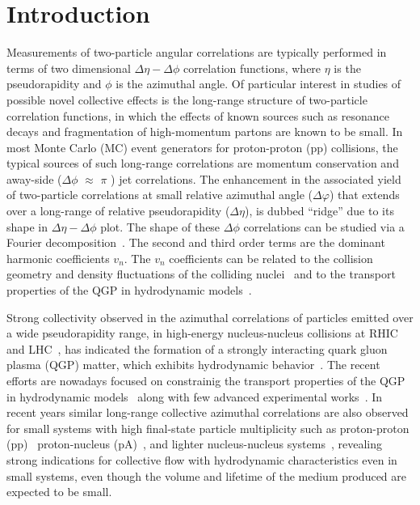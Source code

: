 
\section{Introduction}
\label{sec:intro}

Measurements of two-particle angular correlations are typically performed in terms of two dimensional $\Delta\eta-\Delta\phi$ correlation functions, where $\eta$ is the pseudorapidity and $\phi$ is the azimuthal angle. Of particular interest in studies of possible novel  collective effects is the long-range structure of two-particle correlation functions, in which the effects of known sources such as resonance decays and fragmentation of high-momentum partons are known to be small. In most Monte Carlo (MC) event generators for proton-proton (pp) collisions, the typical sources of such long-range correlations are momentum conservation and away-side ($\Delta\phi$ $\approx$ $\pi$ ) jet correlations.
The enhancement in the associated yield of two-particle correlations at small relative azimuthal angle ($\Delta\varphi$) that extends over a long-range of relative pseudorapidity ($\Delta\eta$), is dubbed ``ridge'' due to its shape in $\Delta\eta-\Delta\phi$ plot.
The shape of these $\Delta\phi$ correlations can be studied via a Fourier decomposition~\cite{Poskanzer:1998yz,Voloshin:2008dg}. The second and third order terms are the dominant harmonic coefficients $v_n$. The $v_n$ coefficients can be related to the collision geometry and density fluctuations of the colliding nuclei~\cite{Alver:2010gr,Alver:2010dn,ALICE:2011ab} and to the transport properties of the QGP in hydrodynamic models~\cite{Bernhard:2016tnd,Bernhard2019}.

Strong collectivity observed in the azimuthal correlations of particles emitted over a wide pseudorapidity range, in high-energy nucleus-nucleus collisions at RHIC~\cite{Adams:2005dq,Adcox:2004mh,Arsene:2004fa,Back:2004je} and LHC~\cite{Abelev:2012di, Abelev:2014pua, ATLAS:2011ah}, has indicated the formation of a strongly interacting quark gluon plasma (QGP) matter, which exhibits hydrodynamic behavior~\cite{Romatschke:2007mq}. The recent efforts are nowadays focused on constrainig the transport properties of the QGP in hydrodynamic models~\cite{Bernhard:2016tnd,Bernhard2019} along with few advanced experimental works~\cite{ALICE:2016kpq,Acharya:2017gsw,Acharya:2017zfg,Acharya:2020taj}.
In recent years similar long-range collective azimuthal correlations are also observed for small systems with high final-state particle multiplicity such as proton-proton (pp)~\cite{Aad:2015gqa,Khachatryan:2015lva,Khachatryan:2016txc,Acharya:2019vdf} proton-nucleus (pA)~\cite{Abelev:2012ola}, and lighter nucleus-nucleus systems~\cite{phenixnature}, revealing strong indications for collective flow with hydrodynamic characteristics even in small systems, even though the volume and lifetime of the medium produced are expected to be small. 

